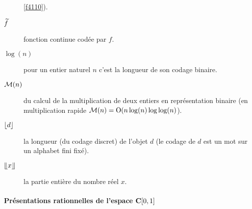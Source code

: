 \begin{description}
\ref{f4110}).
\item[$\widetilde{f}$] fonction continue codée par  $f$.
\item[$\log(n)$] pour un entier naturel $n$ c'est la longueur de son codage binaire.
\item[${{\cal M}}(n)$] \com du calcul de la multiplication de deux entiers en représentation binaire (en multiplication rapide ${{\cal M}}(n) = {\rm O}(n \log(n) \log\log(n)$).
\item[$\lfloor d \rfloor$]	la longueur (du codage discret) de l'objet  $d$  (le codage de  $d$  est un mot sur un alphabet fini fixé).
\item[$\llfloor x \rrfloor$] la partie entière du nombre réel $x$.  
\end{description}

\paragraph{Présentations rationnelles de l'espace  ${{\bf C}[0,1]}$}~

